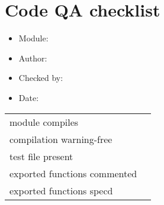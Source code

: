 \documentclass[14pt]{article}
\begin{document}
\section*{Code QA checklist}
\Large
\begin{itemize}
\item Module:
\item Author:
\item Checked by:
\item Date:
\end{itemize}
\Large
\begin{tabularx}{\textwidth}{ X | X }
module compiles & \\
compilation warning-free & \\
test file present & \\
exported functions commented & \\
exported functions specd & \\
\end{tabularx}
\end{document}
